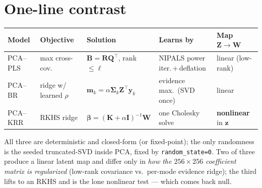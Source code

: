 \documentclass[11pt]{article}
\newcommand{\code}[1]{\texttt{#1}}
\newcommand{\T}{^{\!\top}}
\newcommand{\Z}{\mathbf{Z}}
\newcommand{\W}{\mathbf{W}}
\newcommand{\bI}{\mathbf{I}}
\begin{document}
\section{One-line contrast}\label{sec:contrast}
\begin{center}
\renewcommand{\arraystretch}{1.35}
\begin{tabular}{@{}lllll@{}}
\toprule
Model & Objective & Solution & Learns by & Map $\Z\!\to\!\W$ \\
\midrule
PCA--PLS & max cross-cov. & $\mathbf B=\mathbf R\mathbf Q\T$, rank $\le\ell$ & NIPALS power iter.\,+\,deflation & linear (low-rank) \\
PCA--BR & ridge w/ learned $\rho$ & $\mathbf m_k=\alpha\boldsymbol\Sigma_k\Z\T\mathbf y_k$ & evidence max.\ (SVD once) & linear \\
PCA--KRR & RKHS ridge & $\boldsymbol\beta=(\mathbf K{+}\alpha\bI)^{-1}\W$ & one Cholesky solve & \textbf{nonlinear} in $\mathbf z$ \\
\bottomrule
\end{tabular}
\end{center}

\noindent All three are deterministic and closed-form (or fixed-point); the only randomness is the
seeded truncated-SVD inside PCA, fixed by \code{random\_state=0}. Two of three produce a linear
latent map and differ only in \emph{how the $256\times256$ coefficient matrix is regularized}
(low-rank covariance vs.\ per-mode evidence ridge); the third lifts to an RKHS and is the lone
nonlinear test --- which comes back null.
\end{document}
